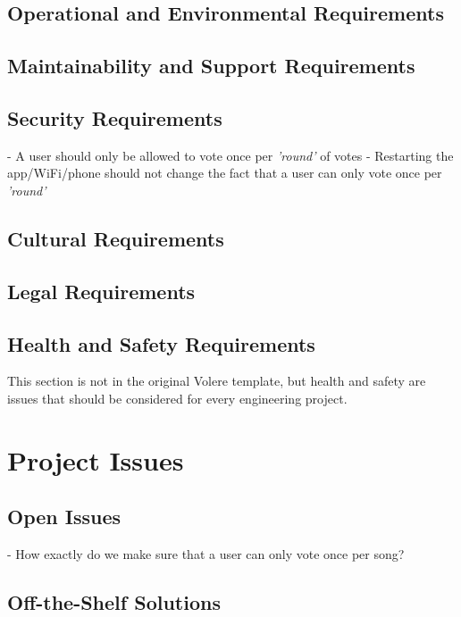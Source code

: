 \documentclass[12pt, titlepage]{article}
\begin{document}
\subsection{Operational and Environmental Requirements}

\subsection{Maintainability and Support Requirements}

\subsection{Security Requirements}

- A user should only be allowed to vote once per \textit{'round'} of votes
- Restarting the app/WiFi/phone should not change the fact that a user can only
  vote once per \textit{'round'}

\subsection{Cultural Requirements}

\subsection{Legal Requirements}

\subsection{Health and Safety Requirements}

This section is not in the original Volere template, but health and safety are
issues that should be considered for every engineering project.

\section{Project Issues}

\subsection{Open Issues}

- How exactly do we make sure that a user can only vote once per song?

\subsection{Off-the-Shelf Solutions}
\end{document}
